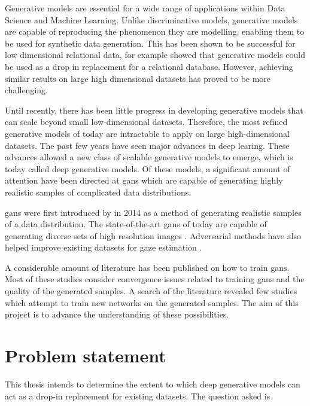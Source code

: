 

Generative models are essential for a wide range of applications within Data Science and Machine Learning. Unlike discriminative models, generative models are capable of reproducing the phenomenon they are modelling, enabling them to be used for synthetic data generation. This has been shown to be successful for low dimensional relational data, for example \textcite{patki2016synthetic} showed that generative models could be used as a drop in replacement for a relational database. However, achieving similar results on large high dimensional datasets has proved to be more challenging.

Until recently, there has been little progress in developing generative models that can scale beyond small low-dimensional datasets. Therefore, the most refined generative models of today are intractable to apply on large high-dimensional datasets. The past few years have seen major advances in deep learing. These advances allowed a new class of scalable generative models to emerge, which is today called deep generative models. Of these models, a significant amount of attention have been directed at \acrfull{gans} which are capable of generating highly realistic samples of complicated data distributions.

\acrlong{gans} were first introduced by \textcite{goodfellow2014generative} in 2014 as a method of generating realistic samples of a data distribution. The state-of-the-art \acrshort{gans} of today are capable of generating diverse sets of high resolution images \cite{karras2017progressive}. Adversarial methods have also helped improve existing datasets for gaze estimation \cite{shrivastava2016learning,sela2017gazegan}. 

A considerable amount of literature has been published on how to train \acrshort{gans}. Most of these studies consider convergence issues related to training \acrshort{gans} and the quality of the generated samples. A search of the literature revealed few studies which attempt to train new networks on the generated samples. The aim of this project is to advance the understanding of these possibilities.

\section{Problem statement}
This thesis intends to determine the extent to which deep generative models can act as a drop-in replacement for existing datasets. The question asked is

